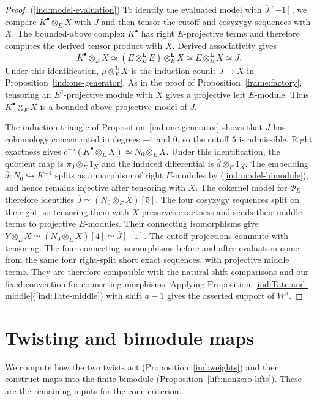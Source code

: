 \documentclass[11pt]{article}
\begin{document}
\begin{proof}
\textup{(\ref{ind:model-evaluation})} To identify the evaluated model with $\overline J[-1]$,
we compare $K^\bullet\otimes_E X$ with $J$ and then tensor the
cutoff and cosyzygy sequences with $X$. The bounded-above complex $K^\bullet$ has right $E$-projective terms and
therefore computes the derived tensor product with $X$. Derived
associativity gives
\[
 K^\bullet\otimes_E X\simeq
 (E\otimes_B^{\mathbf L}E)\otimes_E^{\mathbf L}X
 \simeq E\otimes_B^{\mathbf L}X\simeq J.
\]
Under this identification, $\mu\otimes_E^{\mathbf L}X$ is the
induction counit $J\to X$ in Proposition~\ref{ind:one-generator}.
As in the proof of Proposition~\ref{frame:factory}, tensoring an
$E^e$-projective module with $X$ gives a projective left $E$-module.
Thus $K^\bullet\otimes_E X$ is a bounded-above projective model of $J$.

The induction triangle of Proposition~\ref{ind:one-generator} shows that $J$ has cohomology
concentrated in degrees $-4$ and $0$, so the cutoff $5$ is admissible.
Right exactness gives
$c^{-5}(K^\bullet\otimes_E X)\simeq N_0\otimes_E X$.
Under this identification, the quotient map is
$\pi_0\otimes_E1_X$ and the induced differential is
$\bar d\otimes_E1_X$.
The embedding $\bar d:N_0\hookrightarrow K^{-4}$ splits as a morphism
of right $E$-modules by \textup{(\ref{ind:model-bimodule})}, and hence remains injective
after tensoring with $X$.
The cokernel model for $\Phi_E$ therefore identifies
$\overline J\simeq(N_0\otimes_E X)[5]$.
The four cosyzygy sequences split on the right, so tensoring them
with $X$ preserves exactness and sends their middle terms to
projective $E$-modules. Their connecting isomorphisms give
$Y\otimes_E X\simeq(N_0\otimes_E X)[4]\simeq\overline J[-1]$.
The cutoff projections commute with tensoring.
The four connecting isomorphisms before and after evaluation come
from the same four right-split short exact sequences, with projective
middle terms. They are therefore compatible with the natural shift
comparisons and our fixed convention for connecting morphisms.
Applying Proposition~\ref{ind:Tate-and-middle}\textup{(\ref{ind:Tate-middle})} with shift
$a-1$ gives the asserted support of $W^a$.
\end{proof}

\section{Twisting and bimodule maps}
\label{lift:construction-section}

We compute how the two twists act (Proposition~\ref{ind:weights})
and then construct maps into the finite bimodule
(Proposition~\ref{lift:nonzero-lifts}). These are the remaining inputs
for the cone criterion.
\end{document}
